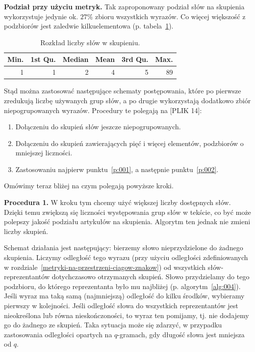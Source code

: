 \documentclass{praca1}
\begin{document}
\textbf{Podział przy użyciu metryk.}
Tak zaproponowany podział słów na skupienia wykorzystuje jedynie ok. $27\%$ zbioru wszystkich wyrazów. Co więcej większość z podzbiorów jest zaledwie kilkuelementowa (p. tabela~\ref{tab:004}). 

\begin{table}[!h]
\centering
\begin{tabular}{|r|r|r|r|r|r|}
  \hline
Min. & 1st Qu. & Median & Mean & 3rd Qu. & Max. \\ 
  \hline
1 & 1 & 2 & 4 & 5 & 89 \\ 
   \hline
\end{tabular}
\caption{Rozkład liczby słów w skupieniu.}
\label{tab:004}
\end{table}


Stąd można zastosować następujące schematy postępowania, które po pierwsze zredukują liczbę używanych grup słów, a po drugie wykorzystają dodatkowo zbiór niepogrupowanych wyrazów. Procedury te polegają na [PLIK 14]:
\begin{enumerate}
\item\label{p:001} Dołączeniu do skupień słów jeszcze niepogrupowanych.
\item\label{p:002} Dołączeniu do skupień zawierających pięć i więcej elementów, podzbiorów o mniejszej liczności.
\item Zastosowaniu najpierw punktu~\ref{p:001}, a następnie punktu~\ref{p:002}.
\end{enumerate}

Omówimy teraz bliżej na czym polegają powyższe kroki.

\textbf{Procedura 1.} W kroku tym chcemy użyć większej liczby dostępnych słów. Dzięki temu zwiększą się liczności występowania grup słów w tekście, co być może polepszy jakość podziału artykułów na skupienia. Algorytm ten jednak nie zmieni liczby skupień. 

Schemat działania jest następujący: bierzemy słowo nieprzydzielone do żadnego skupienia. Liczymy odległość tego wyrazu (przy użyciu odległości zdefiniowanych w rozdziale~\ref{metryki-na-przestrzeni-ciagow-znakow}) od wszystkich słów-reprezentantów dotychczasowo otrzymanych skupień. Słowo przydzielamy do tego podzbioru, do którego reprezentanta było mu najbliżej (p. algorytm~\ref{alg:004}). Jeśli wyraz ma taką samą (najmniejszą) odległość do kilku środków, wybieramy pierwszy w kolejności. Jeśli odległość słowa do wszystkich reprezentantów jest nieokreślona lub równa nieskończoności, to wyraz ten pomijamy, tj. nie dodajemy go do żadnego ze skupień. Taka sytuacja może się zdarzyć, w przypadku zastosowania odległości opartych na $q$-gramach, gdy długość słowa jest mniejsza od $q$.
\end{document}
